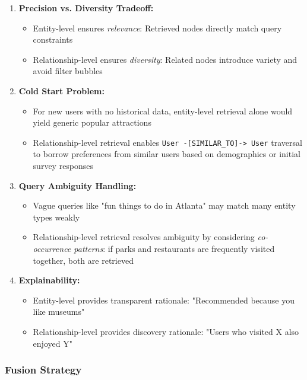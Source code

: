 \documentclass{article} %
\begin{document}
\begin{enumerate}
    \item \textbf{Precision vs. Diversity Tradeoff:}
    \begin{itemize}
        \item Entity-level ensures \textit{relevance}: Retrieved nodes directly match query constraints
        \item Relationship-level ensures \textit{diversity}: Related nodes introduce variety and avoid filter bubbles
    \end{itemize}

    \item \textbf{Cold Start Problem:}
    \begin{itemize}
        \item For new users with no historical data, entity-level retrieval alone would yield generic popular attractions
        \item Relationship-level retrieval enables \texttt{User -[SIMILAR\_TO]-> User} traversal to borrow preferences from similar users based on demographics or initial survey responses
    \end{itemize}

    \item \textbf{Query Ambiguity Handling:}
    \begin{itemize}
        \item Vague queries like "fun things to do in Atlanta" may match many entity types weakly
        \item Relationship-level retrieval resolves ambiguity by considering \textit{co-occurrence patterns}: if parks and restaurants are frequently visited together, both are retrieved
    \end{itemize}

    \item \textbf{Explainability:}
    \begin{itemize}
        \item Entity-level provides transparent rationale: "Recommended because you like museums"
        \item Relationship-level provides discovery rationale: "Users who visited X also enjoyed Y"
    \end{itemize}
\end{enumerate}

\subsubsection{Fusion Strategy}
\end{document}
